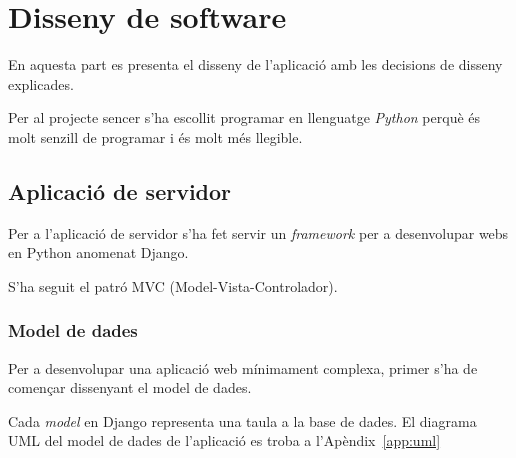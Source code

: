 \chapter{Disseny de software}\label{chapter:disseny de software}

En aquesta part es presenta el disseny de l'aplicació amb les decisions de disseny explicades.

Per al projecte sencer s'ha escollit programar en llenguatge \emph{Python} perquè és molt senzill de programar i és molt més llegible.

\section{Aplicació de servidor}
Per a l'aplicació de servidor s'ha fet servir un \textit{framework} per a desenvolupar webs en Python anomenat Django\autocite{django-tutorial}.

S'ha seguit el patró MVC (Model-Vista-Controlador).

\subsection{Model de dades}
Per a desenvolupar una aplicació web mínimament complexa, primer s'ha de començar dissenyant el model de dades.

Cada \textit{model} en Django representa una taula a la base de dades. El diagrama UML del model de dades de l'aplicació es troba a l'Apèndix~\ref{app:uml}

